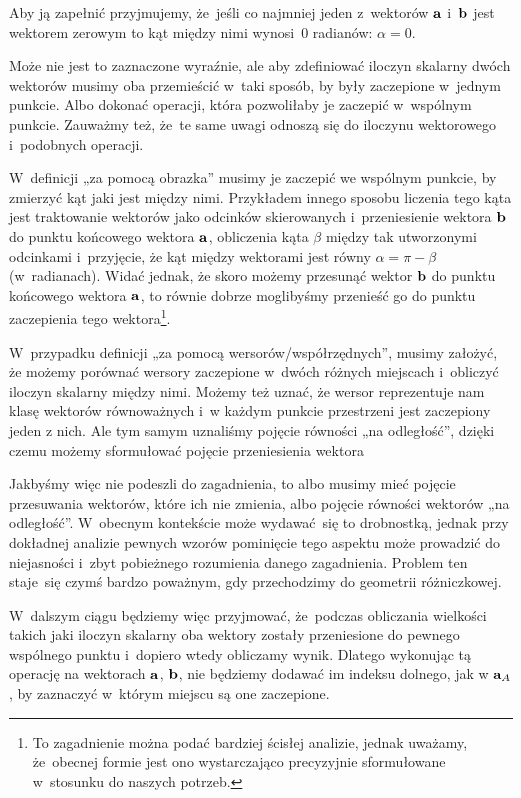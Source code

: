 \documentclass[a4paper,11pt]{article}
\begin{document}
Aby ją zapełnić przyjmujemy, że~jeśli co najmniej jeden z~wektorów
$\mathbf{a}$ i~$\mathbf{b}$ jest wektorem zerowym to kąt między nimi
wynosi~$0$ radianów: $\alpha = 0$.

\vspace{\spaceFour}



 Może nie jest to zaznaczone wyraźnie, ale aby zdefiniować iloczyn
skalarny dwóch wektorów musimy oba przemieścić w~taki sposób, by były
zaczepione w~jednym punkcie. Albo dokonać operacji, która pozwoliłaby je
zaczepić w~wspólnym punkcie. Zauważmy też, że~te same uwagi odnoszą się do iloczynu wektorowego i~podobnych operacji.

W~definicji „za pomocą obrazka” musimy je zaczepić we wspólnym punkcie, by
zmierzyć kąt jaki jest między nimi. Przykładem innego sposobu liczenia tego
kąta jest traktowanie wektorów jako odcinków skierowanych i~przeniesienie
wektora $\mathbf{b}$ do punktu końcowego wektora $\mathbf{a}$, obliczenia kąta
$\beta$ między tak utworzonymi odcinkami i~przyjęcie, że kąt między wektorami
jest równy $\alpha = \pi - \beta$ (w~radianach). Widać jednak, że skoro możemy
przesunąć wektor $\mathbf{b}$ do punktu końcowego wektora $\mathbf{a}$, to
równie dobrze moglibyśmy przenieść go do punktu zaczepienia tego
wektora\footnote{To zagadnienie można podać bardziej ścisłej analizie,
  jednak uważamy, że~obecnej formie jest ono wystarczająco precyzyjnie
  sformułowane w~stosunku do naszych potrzeb.}.

W~przypadku definicji „za pomocą wersorów/współrzędnych”, musimy założyć, że
możemy porównać wersory zaczepione w~dwóch różnych miejscach i~obliczyć
iloczyn skalarny między nimi. Możemy też uznać, że wersor reprezentuje nam
klasę wektorów równoważnych i~w każdym punkcie przestrzeni jest zaczepiony
jeden z nich. Ale tym samym uznaliśmy pojęcie równości „na odległość”,
dzięki czemu możemy sformułować pojęcie przeniesienia wektora

Jakbyśmy więc nie podeszli do zagadnienia, to albo musimy mieć pojęcie
przesuwania wektorów, które ich nie zmienia, albo pojęcie równości wektorów
„na odległość”. W~obecnym kontekście może wydawać~się to drobnostką, jednak
przy dokładnej analizie pewnych wzorów pominięcie tego aspektu może
prowadzić do niejasności i~zbyt pobieżnego rozumienia danego zagadnienia.
Problem ten staje~się czymś bardzo poważnym, gdy przechodzimy do geometrii
różniczkowej.

W~dalszym ciągu będziemy więc przyjmować, że~podczas obliczania wielkości
takich jaki iloczyn skalarny oba wektory zostały przeniesione do pewnego
wspólnego punktu i~dopiero wtedy obliczamy wynik. Dlatego wykonując tą
operację na wektorach $\mathbf{a}$, $\mathbf{b}$, nie będziemy dodawać im
indeksu dolnego, jak w $\mathbf{a}_{ A }$, by zaznaczyć w~którym miejscu są
one zaczepione.
\end{document}
